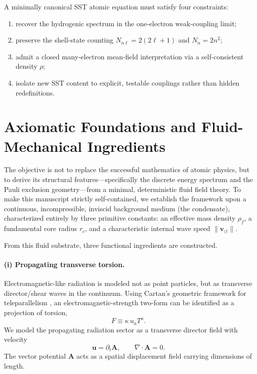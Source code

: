 \documentclass[11pt,a4paper]{article}
\begin{document}
A minimally canonical SST atomic equation must satisfy four constraints:
\begin{enumerate}[label=(C\arabic*)]
    \item recover the hydrogenic spectrum in the one-electron weak-coupling limit;
    \item preserve the shell-state counting $N_{n\ell}=2(2\ell+1)$ and $N_n=2n^2$;
    \item admit a closed many-electron mean-field interpretation via a self-consistent density $\rho$;
    \item isolate new SST content to explicit, testable couplings rather than hidden redefinitions.
\end{enumerate}

\section{Axiomatic Foundations and Fluid-Mechanical Ingredients}
The objective is not to replace the successful mathematics of atomic physics, but to derive its structural features---specifically the discrete energy spectrum and the Pauli exclusion geometry---from a minimal, deterministic fluid field theory. To make this manuscript strictly self-contained, we establish the framework upon a continuous, incompressible, inviscid background medium (the condensate), characterized entirely by three primitive constants: an effective mass density $\rho_{\!f}$, a fundamental core radius $r_c$, and a characteristic internal wave speed $\lVert \mathbf{v}_{\!\boldsymbol{\circlearrowleft}}\rVert$.

From this fluid substrate, three functional ingredients are constructed.

\paragraph{(i) Propagating transverse torsion.} Electromagnetic-like radiation is modeled not as point particles, but as transverse director/shear waves in the continuum. Using Cartan's geometric framework for teleparallelism \cite{HehlObukhov2007}, an electromagnetic-strength two-form can be identified as a projection of torsion,
\begin{equation}
\label{eq:Ftorsion}
F \equiv \kappa\,u_a T^a.
\end{equation}
We model the propagating radiation sector as a transverse director field with velocity
\begin{equation}
\label{eq:uA}
\mathbf{u}=\partial_t \mathbf{A},
\qquad
\nabla\cdot \mathbf{A}=0.
\end{equation}
The vector potential $\mathbf{A}$ acts as a spatial displacement field carrying dimensions of length.
\end{document}
